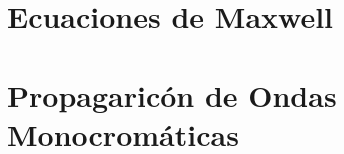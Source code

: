 \chapter{Ecuaciones de Maxwell}














\chapter{Propagaricón de Ondas Monocromáticas}










































